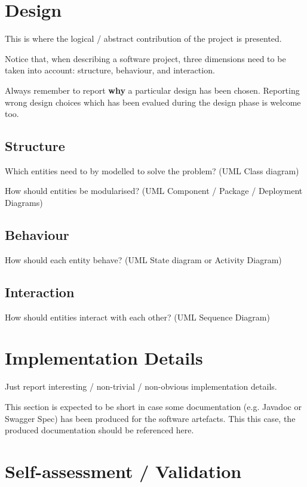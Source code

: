 \documentclass{scrartcl}
\begin{document}
\section{Design}

This is where the logical / abstract contribution of the project is presented.

Notice that, when describing a software project, three dimensions need to be taken into account: structure, behaviour, and interaction.

Always remember to report \textbf{why} a particular design has been chosen.
Reporting wrong design choices which has been evalued during the design phase is welcome too.

\subsection{Structure}

Which entities need to by modelled to solve the problem?
%
(UML Class diagram)

How should entities be modularised?
%
(UML Component / Package / Deployment Diagrams)

\subsection{Behaviour}

How should each entity behave?
%
(UML State diagram or Activity Diagram)

\subsection{Interaction}

How should entities interact with each other?
%
(UML Sequence Diagram)

\section{Implementation Details}

Just report interesting / non-trivial / non-obvious implementation details.

This section is expected to be short in case some documentation (e.g. Javadoc or Swagger Spec) has been produced for the software artefacts.
%
This this case, the produced documentation should be referenced here.

\section{Self-assessment / Validation}
\end{document}
